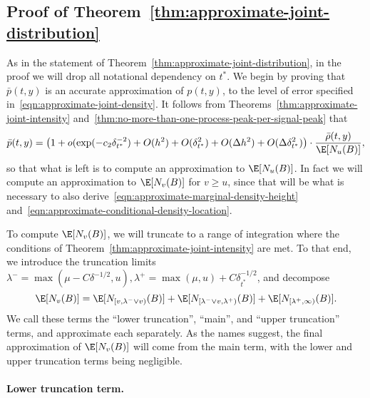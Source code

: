 \documentclass{article}
\newcommand{\ag}[1]{{\bf{{\red{[{AG: #1}]}}}}}
\begin{document}
	\subsection{Proof of Theorem~\ref{thm:approximate-joint-distribution}}
	As in the statement of Theorem~\ref{thm:approximate-joint-distribution}, in the proof we will drop all notational dependency on $t^*$. We begin by proving that $\bar{p}(t,y)$ is an accurate approximation of $p(t,y)$, to the level of error specified in~\eqref{eqn:approximate-joint-density}. It follows from Theorems~\ref{thm:approximate-joint-intensity} and~\ref{thm:no-more-than-one-process-peak-per-signal-peak} that 
	\begin{equation*}
		\bar{p}(t,y) = \big(1 + o(\exp(-c_2\delta_{t^*}^{-2}) + O(h^2) + O(\delta_{t^*}^2) + O(\Delta h^2) + O(\Delta\delta_{t^*}^2)\big) \cdot \frac{\bar{\rho}(t,y)}{\E[N_u(B)]},
	\end{equation*}
	so that what is left is to compute an approximation to $\E[N_u(B)]$. In fact we will compute an approximation to $\E[N_v(B)]$ for $v \geq u$, since that will be what is necessary to also derive~\eqref{eqn:approximate-marginal-density-height} and~\eqref{eqn:approximate-conditional-density-location}. 
	
	To compute $\E[N_v(B)]$, we will truncate to a range of integration where the conditions of Theorem~\ref{thm:approximate-joint-intensity} are met. To that end, we introduce the truncation limits $\lambda^{-} = \max(\mu - C\delta^{-1/2}, u), \lambda^{+} = \max(\mu,u) + C\delta_{t^*}^{-1/2}$, and decompose
	\begin{equation*}
		\E[N_v(B)] = \E[N_{[v,\lambda^{-} \vee v)}(B)] + \E[N_{[\lambda^{-} \vee v, \lambda^{+})}(B)] + \E[N_{[\lambda^{+},\infty)}(B)].
	\end{equation*}
	We call these terms the ``lower truncation'', ``main'', and ``upper truncation'' terms, and approximate each separately. As the names suggest, the final approximation of $\E[N_v(B)]$ will come from the main term, with the lower and upper truncation terms being negligible.
	
	\paragraph{Lower truncation term.}
	\ag{TO COME}
	
\end{document}
